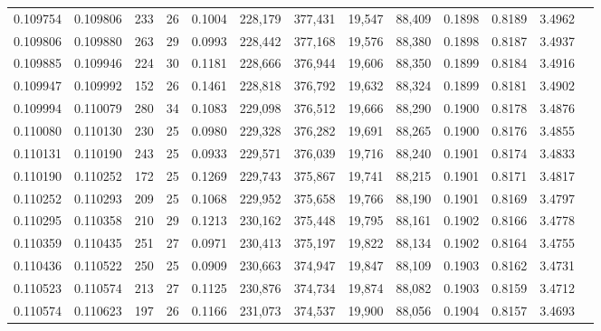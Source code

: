 \begin{tabular}{rrrrrrrrrrrrr}
0.109754 & 0.109806 & 233 &  26 &                                     0.1004 & 228,179 & 377,431 &  19,547 &  88,409 & 0.1898 & 0.8189 & 3.4962 \\
0.109806 & 0.109880 & 263 &  29 &                                     0.0993 & 228,442 & 377,168 &  19,576 &  88,380 & 0.1898 & 0.8187 & 3.4937 \\
0.109885 & 0.109946 & 224 &  30 &                                     0.1181 & 228,666 & 376,944 &  19,606 &  88,350 & 0.1899 & 0.8184 & 3.4916 \\
0.109947 & 0.109992 & 152 &  26 &                                     0.1461 & 228,818 & 376,792 &  19,632 &  88,324 & 0.1899 & 0.8181 & 3.4902 \\
0.109994 & 0.110079 & 280 &  34 &                                     0.1083 & 229,098 & 376,512 &  19,666 &  88,290 & 0.1900 & 0.8178 & 3.4876 \\
0.110080 & 0.110130 & 230 &  25 &                                     0.0980 & 229,328 & 376,282 &  19,691 &  88,265 & 0.1900 & 0.8176 & 3.4855 \\
0.110131 & 0.110190 & 243 &  25 &                                     0.0933 & 229,571 & 376,039 &  19,716 &  88,240 & 0.1901 & 0.8174 & 3.4833 \\
0.110190 & 0.110252 & 172 &  25 &                                     0.1269 & 229,743 & 375,867 &  19,741 &  88,215 & 0.1901 & 0.8171 & 3.4817 \\
0.110252 & 0.110293 & 209 &  25 &                                     0.1068 & 229,952 & 375,658 &  19,766 &  88,190 & 0.1901 & 0.8169 & 3.4797 \\
0.110295 & 0.110358 & 210 &  29 &                                     0.1213 & 230,162 & 375,448 &  19,795 &  88,161 & 0.1902 & 0.8166 & 3.4778 \\
0.110359 & 0.110435 & 251 &  27 &                                     0.0971 & 230,413 & 375,197 &  19,822 &  88,134 & 0.1902 & 0.8164 & 3.4755 \\
0.110436 & 0.110522 & 250 &  25 &                                     0.0909 & 230,663 & 374,947 &  19,847 &  88,109 & 0.1903 & 0.8162 & 3.4731 \\
0.110523 & 0.110574 & 213 &  27 &                                     0.1125 & 230,876 & 374,734 &  19,874 &  88,082 & 0.1903 & 0.8159 & 3.4712 \\
0.110574 & 0.110623 & 197 &  26 &                                     0.1166 & 231,073 & 374,537 &  19,900 &  88,056 & 0.1904 & 0.8157 & 3.4693 \\

\end{tabular}

